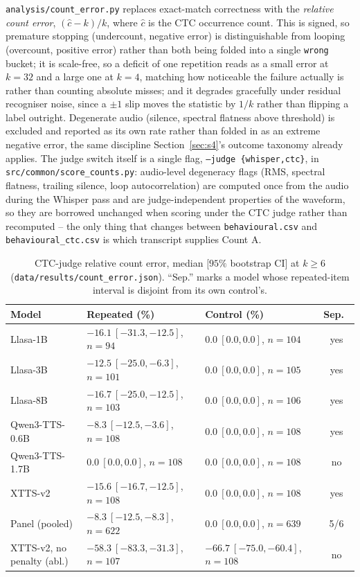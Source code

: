 \documentclass[11pt]{article}
\begin{document}
\texttt{analysis/count\_error.py} replaces exact-match correctness with the
\emph{relative count error}, $(\hat c - k)/k$, where $\hat c$ is the CTC
occurrence count. This is signed, so premature stopping (undercount, negative
error) is distinguishable from looping (overcount, positive error) rather
than both being folded into a single \texttt{wrong} bucket; it is scale-free,
so a deficit of one repetition reads as a small error at $k{=}32$ and a large
one at $k{=}4$, matching how noticeable the failure actually is rather than
counting absolute misses; and it degrades gracefully under residual
recogniser noise, since a $\pm1$ slip moves the statistic by $1/k$ rather
than flipping a label outright. Degenerate audio (silence, spectral flatness
above threshold) is excluded and reported as its own rate rather than folded
in as an extreme negative error, the same discipline Section~\ref{sec:s4}'s
outcome taxonomy already applies. The judge switch itself is a single flag,
\texttt{--judge \{whisper,ctc\}}, in \texttt{src/common/score\_counts.py}:
audio-level degeneracy flags (RMS, spectral flatness, trailing silence, loop
autocorrelation) are computed once from the audio during the Whisper pass and
are judge-independent properties of the waveform, so they are borrowed
unchanged when scoring under the CTC judge rather than recomputed -- the
only thing that changes between \texttt{behavioural.csv} and
\texttt{behavioural\_ctc.csv} is which transcript supplies Count A.

\begin{table}[h]
\centering
\caption{CTC-judge relative count error, median $[95\%$ bootstrap CI$]$ at
$k\ge6$ (\texttt{data/results/count\_error.json}). ``Sep.'' marks a model
whose repeated-item interval is disjoint from its own control's.}
\label{tab:counterror}
\footnotesize
\begin{tabular}{@{}p{2.9cm}p{3.6cm}p{3.0cm}c@{}}
\toprule
Model & Repeated (\%) & Control (\%) & Sep.\ \\
\midrule
Llasa-1B & $-16.1\ [-31.3,-12.5]$, $n{=}94$ & $0.0\ [0.0,0.0]$, $n{=}104$ & yes \\
Llasa-3B & $-12.5\ [-25.0,-6.3]$, $n{=}101$ & $0.0\ [0.0,0.0]$, $n{=}105$ & yes \\
Llasa-8B & $-16.7\ [-25.0,-12.5]$, $n{=}103$ & $0.0\ [0.0,0.0]$, $n{=}106$ & yes \\
Qwen3-TTS-0.6B & $-8.3\ [-12.5,-3.6]$, $n{=}108$ & $0.0\ [0.0,0.0]$, $n{=}108$ & yes \\
Qwen3-TTS-1.7B & $0.0\ [0.0,0.0]$, $n{=}108$ & $0.0\ [0.0,0.0]$, $n{=}108$ & no \\
XTTS-v2 & $-15.6\ [-16.7,-12.5]$, $n{=}108$ & $0.0\ [0.0,0.0]$, $n{=}108$ & yes \\
\midrule
Panel (pooled) & $-8.3\ [-12.5,-8.3]$, $n{=}622$ & $0.0\ [0.0,0.0]$, $n{=}639$ & 5/6 \\
XTTS-v2, no penalty (abl.) & $-58.3\ [-83.3,-31.3]$, $n{=}107$ & $-66.7\ [-75.0,-60.4]$, $n{=}108$ & no \\
\bottomrule
\end{tabular}
\end{table}
\end{document}
